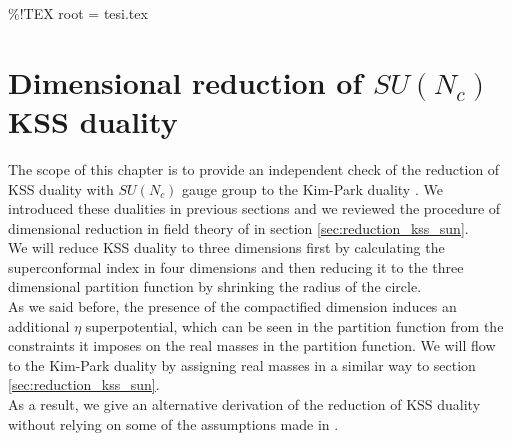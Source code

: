 \%!TEX root = tesi.tex


\chapter{\bfseries \boldmath Dimensional reduction of $SU(N_c)$ KSS duality}
\label{chap:my_work}

The scope of this chapter is to provide an independent check  of the reduction of KSS duality with $SU(N_c)$ gauge group to the Kim-Park duality \cite{Nii:2014jsa}.
We introduced these dualities in previous sections and we reviewed the procedure of dimensional reduction in field theory of \cite{Nii:2014jsa} in section \ref{sec:reduction_kss_sun}.\\
We will reduce KSS duality to three dimensions first by calculating the superconformal index in four dimensions and then reducing it to the three dimensional partition function by shrinking the radius of the circle.\\
As we said before, the presence of the compactified dimension induces an additional $\eta$ superpotential, which can be seen in the partition function from the constraints it imposes on the real masses in the partition function.
We will flow to the Kim-Park duality by assigning real masses in a similar way to section \ref{sec:reduction_kss_sun}.\\
As a result, we give an alternative derivation of the reduction of KSS duality without relying on some of the assumptions made in \cite{Nii:2014jsa}.








